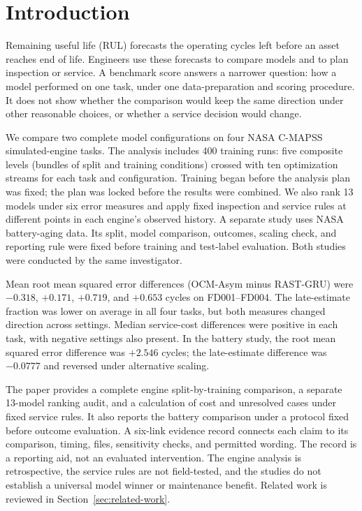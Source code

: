 \documentclass[preprint,12pt,numbers,sort&compress]{elsarticle}
\begin{document}
\section{Introduction}

Remaining useful life (RUL) forecasts the operating cycles left before an asset reaches end of life. Engineers use these forecasts to compare models and to plan inspection or service. A benchmark score answers a narrower question: how a model performed on one task, under one data-preparation and scoring procedure. It does not show whether the comparison would keep the same direction under other reasonable choices, or whether a service decision would change.

We compare two complete model configurations on four NASA C-MAPSS simulated-engine tasks. The analysis includes 400 training runs: five composite levels (bundles of split and training conditions) crossed with ten optimization streams for each task and configuration. Training began before the analysis plan was fixed; the plan was locked before the results were combined. We also rank 13 models under six error measures and apply fixed inspection and service rules at different points in each engine's observed history. A separate study uses NASA battery-aging data. Its split, model comparison, outcomes, scaling check, and reporting rule were fixed before training and test-label evaluation. Both studies were conducted by the same investigator.

Mean root mean squared error differences (OCM-Asym minus RAST-GRU) were $-0.318$, $+0.171$, $+0.719$, and $+0.653$ cycles on FD001--FD004. The late-estimate fraction was lower on average in all four tasks, but both measures changed direction across settings. Median service-cost differences were positive in each task, with negative settings also present. In the battery study, the root mean squared error difference was $+2.546$ cycles; the late-estimate difference was $-0.0777$ and reversed under alternative scaling.

The paper provides a complete engine split-by-training comparison, a separate 13-model ranking audit, and a calculation of cost and unresolved cases under fixed service rules. It also reports the battery comparison under a protocol fixed before outcome evaluation. A six-link evidence record connects each claim to its comparison, timing, files, sensitivity checks, and permitted wording. The record is a reporting aid, not an evaluated intervention. The engine analysis is retrospective, the service rules are not field-tested, and the studies do not establish a universal model winner or maintenance benefit. Related work is reviewed in Section~\ref{sec:related-work}.
\end{document}
